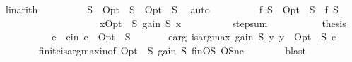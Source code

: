 \begin{isabellebody}
\ linarith\isanewline
\ \ \ \ \ \ \isamarkupfalse%
\ \isamarkupfalse%
\ {\isachardoublequoteopen}S\ {\isasymunion}\ Opt\ {\isacharequal}{\kern0pt}\ S\ {\isasymunion}\ {\isacharparenleft}{\kern0pt}Opt\ {\isacharminus}{\kern0pt}\ S{\isacharparenright}{\kern0pt}{\isachardoublequoteclose}\ \isamarkupfalse%
\ auto\isanewline
\ \ \ \ \ \ \isamarkupfalse%
\ \isamarkupfalse%
\ {\isachardoublequoteopen}f\ {\isacharparenleft}{\kern0pt}S\ {\isasymunion}\ {\isacharparenleft}{\kern0pt}Opt\ {\isacharminus}{\kern0pt}\ S{\isacharparenright}{\kern0pt}{\isacharparenright}{\kern0pt}\ {\isacharminus}{\kern0pt}\ f\ S\isanewline
\ \ \ \ \ \ \ \ \ \ \ \ \ \ \ \ \ \ \ {\isasymle}\ {\isacharparenleft}{\kern0pt}{\isasymSum}x{\isasymin}Opt\ {\isacharminus}{\kern0pt}\ S{\isachardot}{\kern0pt}\ gain\ S\ x{\isacharparenright}{\kern0pt}{\isachardoublequoteclose}\isanewline
\ \ \ \ \ \ \ \ \isamarkupfalse%
\ step{\isacharunderscore}{\kern0pt}sum\ \isakeywordONE{{\isachardot}{\kern0pt}}\isamarkupfalse%
\isanewline
\ \ \ \ \ \ \isamarkupfalse%
\ \isamarkupfalse%
\ {\isacharquery}{\kern0pt}thesis\ \isakeywordONE{{\isachardot}{\kern0pt}}\isamarkupfalse%
\isanewline
\ \ \ \ \isamarkupfalse%
\isanewline
\isanewline
\ \ \ \ \isamarkupfalse%
\ e\ \ e{\isacharunderscore}{\kern0pt}in{\isacharcolon}{\kern0pt}\ {\isachardoublequoteopen}e\ {\isasymin}\ Opt\ {\isacharminus}{\kern0pt}\ S{\isachardoublequoteclose}\isanewline
\ \ \ \ \ \ \ e{\isacharunderscore}{\kern0pt}arg{\isacharcolon}{\kern0pt}\ {\isachardoublequoteopen}is{\isacharunderscore}{\kern0pt}arg{\isacharunderscore}{\kern0pt}max\ {\isacharparenleft}{\kern0pt}gain\ S{\isacharparenright}{\kern0pt}\ {\isacharparenleft}{\kern0pt}{\isasymlambda}y{\isachardot}{\kern0pt}\ y\ {\isasymin}\ Opt\ {\isacharminus}{\kern0pt}\ S{\isacharparenright}{\kern0pt}\ e{\isachardoublequoteclose}\isanewline
\ \ \ \ \ \ \isamarkupfalse%
\ finite{\isacharunderscore}{\kern0pt}is{\isacharunderscore}{\kern0pt}arg{\isacharunderscore}{\kern0pt}max{\isacharunderscore}{\kern0pt}in{\isacharbrackleft}{\kern0pt}of\ {\isachardoublequoteopen}Opt\ {\isacharminus}{\kern0pt}\ S{\isachardoublequoteclose}\ {\isachardoublequoteopen}gain\ S{\isachardoublequoteclose}{\isacharbrackright}{\kern0pt}\ finOS\ OS{\isacharunderscore}{\kern0pt}ne\isanewline
\ \ \ \ \ \ \isamarkupfalse%
\ blast\isanewline
\isanewline

\end{isabellebody}
